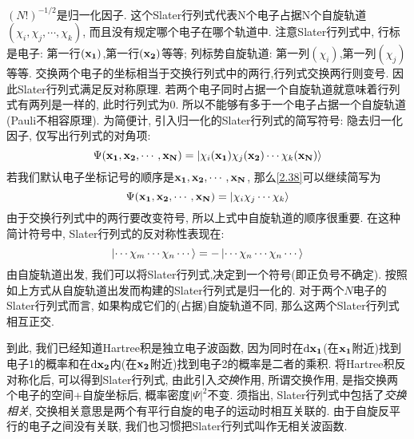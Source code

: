 $(N!)^{-1/2}$是归一化因子. 这个Slater行列式代表N个电子占据N个自旋轨道$(\chi_i,\chi_j,\cdots,\chi_k)$, 而且没有规定哪个电子在哪个轨道中. 注意Slater行列式中, 行标是电子: 第一行$(\mathbf{x_1})$,第一行$(\mathbf{x_2})$等等; 列标势自旋轨道: 第一列$(\chi_i)$,第一列$(\chi_j)$等等. 交换两个电子的坐标相当于交换行列式中的两行,行列式交换两行则变号. 因此Slater行列式满足反对称原理. 若两个电子同时占据一个自旋轨道就意味着行列式有两列是一样的, 此时行列式为$0$. 所以不能够有多于一个电子占据一个自旋轨道(Pauli不相容原理). 为简便计, 引入归一化的Slater行列式的简写符号: 隐去归一化因子, 仅写出行列式的对角项:
\begin{equation}
\label{2.38}
\Psi(\mathbf{x_1,x_2,\cdots,x_N})=\Ket{\chi_i(\mathbf{x_1})\chi_j(\mathbf{x_2})\cdots\chi_k(\mathbf{x_N})}
\end{equation}
若我们默认电子坐标记号的顺序是$\mathbf{x_1,x_2,\cdots,x_N}$, 那么\ref{2.38}可以继续简写为
\begin{equation}
\Psi(\mathbf{x_1,x_2,\cdots,x_N})=\Ket{\chi_i\chi_j\cdots\chi_k}
\end{equation}
由于交换行列式中的两行要改变符号, 所以上式中自旋轨道的顺序很重要. 在这种简计符号中, Slater行列式的反对称性表现在:
\begin{equation}
\Ket{\cdots\chi_m\cdots\chi_n\cdots}=-\Ket{\cdots\chi_n\cdots\chi_n\cdots}
\end{equation}
由自旋轨道出发, 我们可以将Slater行列式,决定到一个符号(即正负号不确定). 按照如上方式从自旋轨道出发而构建的Slater行列式是归一化的. 对于两个$N$电子的Slater行列式而言, 如果构成它们的(占据)自旋轨道不同, 那么这两个Slater行列式相互正交.


到此, 我们已经知道Hartree积是独立电子波函数, 因为同时在$\dd\bo{x_1}$(在$\mathbf{x_1}$附近)找到电子1的概率和在$\dd\bo{x_2}$内(在$\mathbf{x_2}$附近)找到电子2的概率是二者的乘积. 将Hartree积反对称化后, 可以得到Slater行列式, 由此引入\emph{交换}作用, 所谓交换作用, 是指交换两个电子的空间+自旋坐标后, 概率密度$|\Psi|^2$不变. 须指出, Slater行列式中包括了\emph{交换相关}, 交换相关意思是两个有平行自旋的电子的运动时相互关联的. 由于自旋反平行的电子之间没有关联, 我们也习惯把Slater行列式叫作无相关波函数.

